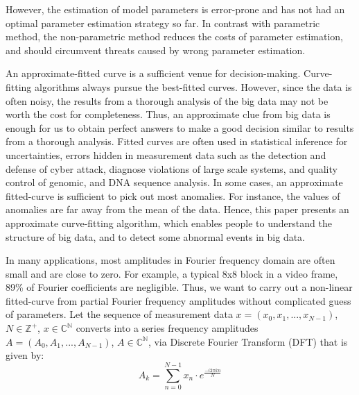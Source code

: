 \documentclass{sig-alternate}
\begin{document}
 








However, the estimation of model parameters is error-prone and has not had an optimal parameter estimation strategy so far. In contrast with parametric method, the non-parametric method reduces the costs of parameter estimation, and should circumvent threats caused by wrong parameter estimation. 


An approximate-fitted curve is a sufficient venue for decision-making. Curve-fitting algorithms always pursue the best-fitted curves. However, since the data is often noisy, the results from a thorough analysis of the big data may not be worth the cost for completeness. Thus, an approximate clue from big data is enough for us to obtain perfect answers to make a good decision similar to results from a thorough analysis. Fitted curves are often used in statistical inference for uncertainties, errors hidden in measurement data such as the detection and defense of cyber attack, diagnose violations of large scale systems, and quality control of genomic, and DNA sequence analysis. In some cases, an approximate fitted-curve is sufficient to pick out most anomalies. For instance, the values of anomalies are far away from the mean of the data. Hence, this paper presents an approximate curve-fitting algorithm, which enables people to understand the structure of big data, and to detect some abnormal events in big data.
  
In many applications, most amplitudes in Fourier frequency domain are often small and are close to zero. For example, a typical 8x8 block in a video frame, 89\% of Fourier coefficients are negligible\cite{Hassanieh:2012, Chandrakasan:1996}. Thus, we want to carry out a non-linear fitted-curve from partial Fourier frequency amplitudes without complicated guess of parameters. Let the sequence of measurement data $x=(x_0, x_1, ..., x_{N-1})$, $N\in \mathbb{Z}^+$, $x\in \mathbb{C^N}$ converts into a series frequency amplitudes $A=(A_0, A_1, ..., A_{N-1})$, $A\in \mathbb{C^N}$, via Discrete Fourier Transform (DFT) that is given by:
\begin{displaymath}
A_k = \sum_{n=0}^{N-1} x_n \cdot e^{\frac{-i2\pi kn}{N}}
\end{displaymath}
\end{document}

